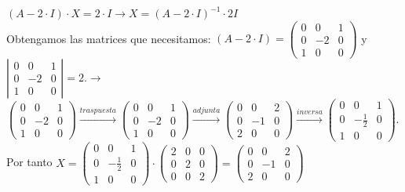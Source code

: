 \documentclass[addpoints,spanish, 12pt,a4paper]{exam}
\begin{document}
\begin{questions}
\begin{parts}
\begin{solution}
$(A-2\cdot I )\cdot X = 2\cdot I \to X=(A-2\cdot I)^{-1}\cdot 2I$\\Obtengamos las matrices que necesitamos: $(A-2\cdot I )=\left(\begin{matrix}0 & 0 & 1\\0 & -2 & 0\\1 & 0 & 0\end{matrix}\right)$ y $\left|\begin{matrix}0 & 0 & 1\\0 & -2 & 0\\1 & 0 & 0\end{matrix}\right|=2$.$\rightarrow$ $\left(\begin{matrix}0 & 0 & 1\\0 & -2 & 0\\1 & 0 & 0\end{matrix}\right)\xrightarrow{traspuesta}\left(\begin{matrix}0 & 0 & 1\\0 & -2 & 0\\1 & 0 & 0\end{matrix}\right)\xrightarrow{adjunta}\left(\begin{matrix}0 & 0 & 2\\0 & -1 & 0\\2 & 0 & 0\end{matrix}\right)\xrightarrow{inversa}\left(\begin{matrix}0 & 0 & 1\\0 & - \frac{1}{2} & 0\\1 & 0 & 0\end{matrix}\right)$.\\Por tanto $X=\left(\begin{matrix}0 & 0 & 1\\0 & - \frac{1}{2} & 0\\1 & 0 & 0\end{matrix}\right)\cdot\left(\begin{matrix}2 & 0 & 0\\0 & 2 & 0\\0 & 0 & 2\end{matrix}\right)=\left(\begin{matrix}0 & 0 & 2\\0 & -1 & 0\\2 & 0 & 0\end{matrix}\right)$
\end{solution}
\end{parts}

\addpoints







\end{questions}
\end{document}
